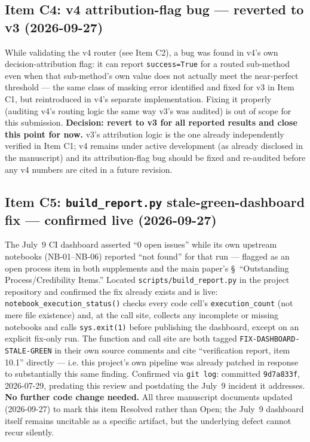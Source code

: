 \documentclass[11pt]{article}
\begin{document}
\subsection*{Item C4: v4 attribution-flag bug — reverted to v3 (2026-09-27)}
While validating the v4 router (see Item C2), a bug was found in v4's own
decision-attribution flag: it can report \texttt{success=True} for a routed
sub-method even when that sub-method's own value does not actually meet the
near-perfect threshold — the same class of masking error identified and
fixed for v3 in Item C1, but reintroduced in v4's separate implementation.
Fixing it properly (auditing v4's routing logic the same way v3's was
audited) is out of scope for this submission. \textbf{Decision: revert to
v3 for all reported results and close this point for now.} v3's
attribution logic is the one already independently verified in Item C1; v4
remains under active development (as already disclosed in the manuscript)
and its attribution-flag bug should be fixed and re-audited before any v4
numbers are cited in a future revision.

\subsection*{Item C5: \texttt{build\_report.py} stale-green-dashboard fix — confirmed live (2026-09-27)}
The July~9 CI dashboard asserted ``0 open issues'' while its own upstream
notebooks (NB-01--NB-06) reported ``not found'' for that run --- flagged
as an open process item in both supplements and the main paper's
\S~``Outstanding Process/Credibility Items.'' Located
\texttt{scripts/build\_report.py} in the project repository and confirmed
the fix already exists and is live: \texttt{notebook\_execution\_status()}
checks every code cell's \texttt{execution\_count} (not mere file
existence) and, at the call site, collects any incomplete or missing
notebooks and calls \texttt{sys.exit(1)} before publishing the dashboard,
except on an explicit fix-only run. The function and call site are both
tagged \texttt{FIX-DASHBOARD-STALE-GREEN} in their own source comments and
cite ``verification report, item 10.1'' directly --- i.e. this project's
own pipeline was already patched in response to substantially this same
finding. Confirmed via \texttt{git log}: committed \texttt{9d7a833f},
2026-07-29, predating this review and postdating the July~9 incident it
addresses. \textbf{No further code change needed.} All three manuscript
documents updated (2026-09-27) to mark this item Resolved rather than
Open; the July~9 dashboard itself remains uncitable as a specific
artifact, but the underlying defect cannot recur silently.
\end{document}
